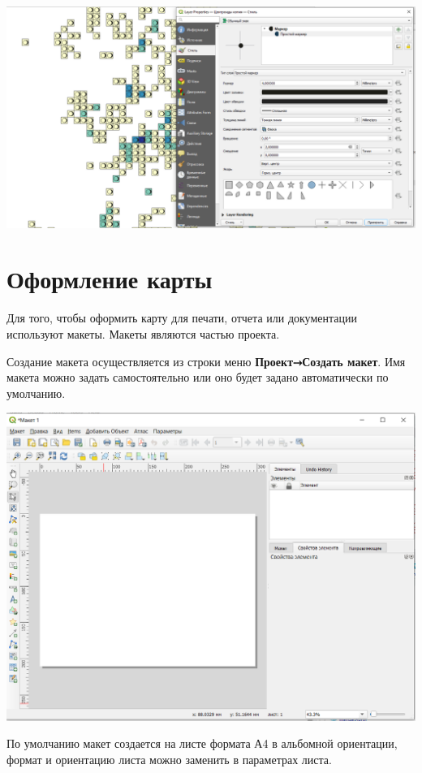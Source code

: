 \documentclass[
]{book}
\begin{document}
\includegraphics{figures/26.png}

\hypertarget{ux43eux444ux43eux440ux43cux43bux435ux43dux438ux435-ux43aux430ux440ux442ux44b}{%
\section{Оформление карты}\label{ux43eux444ux43eux440ux43cux43bux435ux43dux438ux435-ux43aux430ux440ux442ux44b}}

Для того, чтобы оформить карту для печати, отчета или документации используют макеты. Макеты являются частью проекта.

Создание макета осуществляется из строки меню \textbf{Проект⤑Создать макет}. Имя макета можно задать самостоятельно или оно будет задано автоматически по умолчанию.

\includegraphics{figures/27.PNG}

По умолчанию макет создается на листе формата А4 в альбомной ориентации, формат и ориентацию листа можно заменить в параметрах листа.
\end{document}
